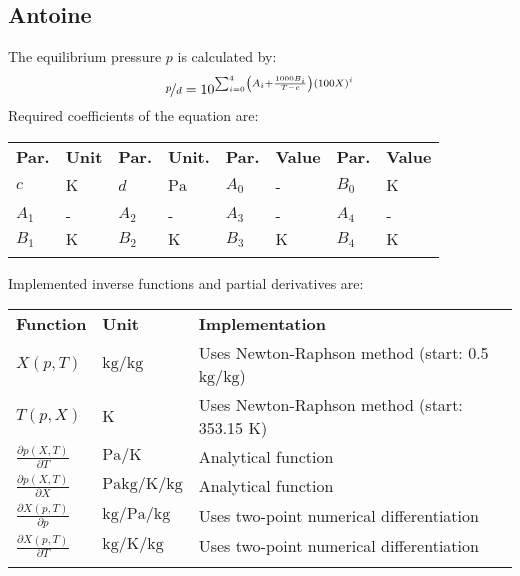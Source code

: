 \subsection{Antoine}
\label{cha:approaches:abs:con:antoine}
%
The equilibrium pressure $p$ is calculated by:
%
\begin{equation*}
	\nicefrac{p}{d} = 10 ^ { \sum_{i=0}^{4} \left( A_i + \frac{1000 B_i}{T - c} \right) \left( 100 X \right) ^{i}}
\end{equation*}
%
Required coefficients of the equation are:
%
\begin{longtable}[l]{ll|ll|ll|ll}
\toprule
\addlinespace
\textbf{Par.} & \textbf{Unit} & \textbf{Par.} &	\textbf{Unit.} & \textbf{Par.} & \textbf{Value} & \textbf{Par.} & \textbf{Value} \\
\addlinespace
\midrule
\endhead

\bottomrule
\endfoot
\bottomrule
\endlastfoot
\addlinespace

$c$ & $\si{\kelvin}$ & $d$ & $\si{\pascal}$ & $A_0$ & - & $B_0$ & $\si{\kelvin}$ \\
$A_1$ & - & $A_2$ & - & $A_3$ & - & $A_4$ & - \\
$B_1$ & $\si{\kelvin}$ & $B_2$ & $\si{\kelvin}$ & $B_3$ & $\si{\kelvin}$ & $B_4$ & $\si{\kelvin}$ \\

\addlinespace
\end{longtable}
%
Implemented inverse functions and partial derivatives are:
%
\begin{longtable}[l]{l|l|l}
	\toprule
	\addlinespace
	\textbf{Function} & \textbf{Unit} &	\textbf{Implementation} \\
	\addlinespace
	\midrule
	\endhead
	
	\bottomrule
	\endfoot
	\bottomrule
	\endlastfoot
	\addlinespace
	
	$X(p,T)$& $\si{\kilogram\per\kilogram}$ & Uses Newton-Raphson method (start: 0.5 $\si{\kilogram\per\kilogram}$) \\
	$T(p,X)$& $\si{\kelvin}$ & Uses Newton-Raphson method (start: 353.15 K) \\
	$\frac{\partial p(X,T)}{\partial T}$	& $\si{\pascal\per\kelvin}$ & Analytical function\\
	$\frac{\partial p(X,T)}{\partial X}$	& $\si{\pascal\kilogram\per\kelvin\per\kilogram}$ & Analytical function\\
	$\frac{\partial X(p,T)}{\partial p}$	& $\si{\kilogram\per\pascal\per\kilogram}$ & Uses two-point numerical differentiation\\
	$\frac{\partial X(p,T)}{\partial T}$	& $\si{\kilogram\per\kelvin\per\kilogram}$ & Uses two-point numerical differentiation\\
	
	\addlinespace
\end{longtable}
%

